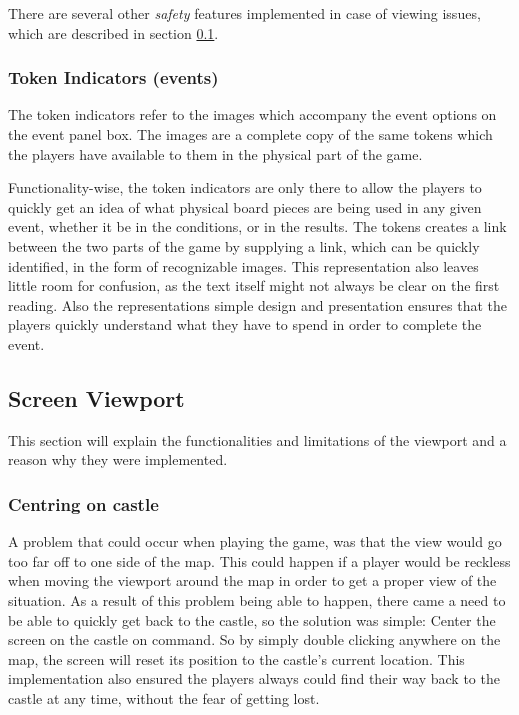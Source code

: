 There are several other \textit{safety} features implemented in case of viewing issues, which are described in section \ref{sec:cam}.

\subsubsection{Token Indicators (events)}
The token indicators refer to the images which accompany the event options on the event panel box. The images are a complete copy of the same tokens which the players have available to them in the physical part of the game. 

Functionality-wise, the token indicators are only there to allow the players to quickly get an idea of what physical board pieces are being used in any given event, whether it be in the conditions, or in the results. 
The tokens creates a link between the two parts of the game by supplying a link, which can be quickly identified, in the form of recognizable images. 
This representation also leaves little room for confusion, as the text itself might not always be clear on the first reading. 
Also the representations simple design and presentation ensures that the players quickly understand what they have to spend in order to complete the event. 

\subsection{Screen Viewport}
\label{sec:cam}
This section will explain the functionalities and limitations of the viewport and a reason why they were implemented.

\subsubsection{Centring on castle}
A problem that could occur when playing the game, was that the view would go too far off to one side of the map. This could happen if a player would be reckless when moving the viewport around the map in order to get a proper view of the situation. As a result of this problem being able to happen, there came a need to be able to quickly get back to the castle, so the solution was simple: Center the screen on the castle on command. 
So by simply double clicking anywhere on the map, the screen will reset its position to the castle's current location. 
This implementation also ensured the players always could find their way back to the castle at any time, without the fear of getting lost.

